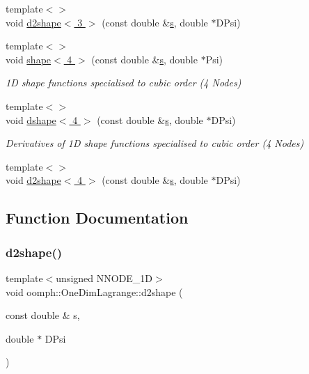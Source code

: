 \begin{DoxyCompactItemize}
{\footnotesize template$<$$>$ }\\void \hyperlink{namespaceoomph_1_1OneDimLagrange_a9ed8561ccff2c23c63807c8c1b62d1a8}{d2shape$<$ 3 $>$} (const double \&\hyperlink{cfortran_8h_ab7123126e4885ef647dd9c6e3807a21c}{s}, double $\ast$D\+Psi)
\item 
{\footnotesize template$<$$>$ }\\void \hyperlink{namespaceoomph_1_1OneDimLagrange_aead7e479371c7eb764b8f4ad68986ade}{shape$<$ 4 $>$} (const double \&\hyperlink{cfortran_8h_ab7123126e4885ef647dd9c6e3807a21c}{s}, double $\ast$Psi)
\begin{DoxyCompactList}\small\item\em 1D shape functions specialised to cubic order (4 Nodes) \end{DoxyCompactList}\item 
{\footnotesize template$<$$>$ }\\void \hyperlink{namespaceoomph_1_1OneDimLagrange_aae4d85c677e27103cc7163b298cd4cba}{dshape$<$ 4 $>$} (const double \&\hyperlink{cfortran_8h_ab7123126e4885ef647dd9c6e3807a21c}{s}, double $\ast$D\+Psi)
\begin{DoxyCompactList}\small\item\em Derivatives of 1D shape functions specialised to cubic order (4 Nodes) \end{DoxyCompactList}\item 
{\footnotesize template$<$$>$ }\\void \hyperlink{namespaceoomph_1_1OneDimLagrange_aa79886f1732f57679a30e9632c50a09a}{d2shape$<$ 4 $>$} (const double \&\hyperlink{cfortran_8h_ab7123126e4885ef647dd9c6e3807a21c}{s}, double $\ast$D\+Psi)
\end{DoxyCompactItemize}


\subsection{Function Documentation}
\mbox{\label{namespaceoomph_1_1OneDimLagrange_a9515ce1aa8ef987244c379655c41fa01}} 
\subsubsection{\texorpdfstring{d2shape()}{d2shape()}}
{\footnotesize\ttfamily template$<$unsigned N\+N\+O\+D\+E\+\_\+1D$>$ \\
void oomph\+::\+One\+Dim\+Lagrange\+::d2shape (\begin{DoxyParamCaption}\item[{const double \&}]{s,  }\item[{double $\ast$}]{D\+Psi }\end{DoxyParamCaption})}



